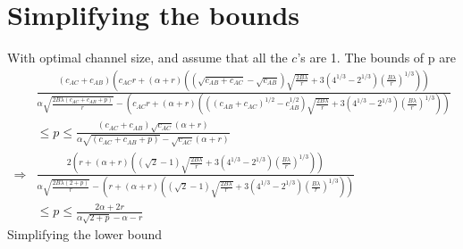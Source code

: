 \documentclass[12pt]{article}
\theoremstyle{plain}
\theoremstyle{remark}
\theoremstyle{definition}
\renewcommand{\leq}{\leqslant}
\renewcommand{\leq}{\leqslant}
\begin{document}
\section{Simplifying the bounds}
With optimal channel size, and assume that all the $c$'s are 1. The bounds of p are 
\begin{align}
    &\frac{(c_{AC}+c_{AB})(c_{AC}r + (\alpha + r)((\sqrt{c_{AB}+ c_{AC}}-\sqrt{c_{AB}})\sqrt{\frac{2B\lambda }{r}} + 3(4^{1/3}-2^{1/3})(\frac{B\lambda}{r})^{1/3}))}{\alpha\sqrt{\frac{2B\lambda (c_{AC}+c_{AB}+p)}{r}}-(c_{AC}r + (\alpha + r)(((c_{AB}+ c_{AC})^{1/2}-c_{AB}^{1/2})\sqrt{\frac{2B\lambda }{r}} + 3(4^{1/3}-2^{1/3})(\frac{B\lambda}{r})^{1/3}))}\\
    &\leq p \leq  \frac{(c_{AC}+c_{AB})\sqrt{c_{AC}}(\alpha + r)}{\alpha\sqrt{(c_{AC}+c_{AB}+p)}-\sqrt{c_{AC}}(\alpha + r)}\\
    \Rightarrow &\frac{2(r + (\alpha + r)((\sqrt{2}-1)\sqrt{\frac{2B\lambda }{r}} + 3(4^{1/3}-2^{1/3})(\frac{B\lambda}{r})^{1/3}))}{\alpha\sqrt{\frac{2B\lambda (2+p)}{r}}-(r + (\alpha + r)((\sqrt{2}-1)\sqrt{\frac{2B\lambda }{r}} + 3(4^{1/3}-2^{1/3})(\frac{B\lambda}{r})^{1/3}))} \\
    & \leq p \leq  \frac{2\alpha + 2r}{\alpha\sqrt{2+p}-\alpha - r}
\end{align}
Simplifying the lower bound
\end{document}
